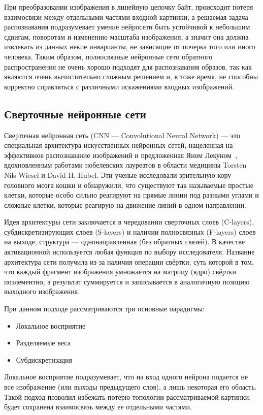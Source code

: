 \documentclass[a4paper,14pt]{extarticle} %
\begin{document}
При преобразовании изображения в линейную цепочку байт, происходит потеря взаимосвязи между отдельными частями входной картинки, а решаемая задача распознавания подразумевает умение нейросети быть устойчивой к небольшим сдвигам, поворотам и изменению масштаба изображения, а значит она должна извлекать из данных некие инварианты, не зависящие от почерка того или иного человека. Таким образом, полносвязные нейронные сети обратного распространения не очень хорошо подходят для распознавания образов, так как являются очень вычислительно сложным решением и, в тоже время, не способны корректно справляться с различными искажениями входных изображений.

\subsection{Сверточные нейронные сети}
\hspace{\parindent} Сверточная нейронная сеть (CNN --- Convolutional Neural Network) --- это специальная архитектура искусственных нейронных сетей, нацеленная на эффективное распознавание изображений и предложенная Яном Лекуном~\cite{lecuncomparison}, вдохновленным работами нобелевских лауреатов в области медицины Torsten Nils Wiesel и David H. Hubel. Эти ученые исследовали зрительную кору головного мозга кошки и обнаружили, что существуют так называемые простые клетки, которые особо сильно реагируют на прямые линии под разными углами и сложные клетки, которые реагирую на движение линий в одном направлении. 

Идея архитектуры сети заключается в чередовании сверточных слоев (C-layers), субдискретизирующих слоев (S-layers) и наличии полносвязных (F-layers) слоев на выходе, структура --- однонаправленная (без обратных связей). В качестве активационной используется любая функция по выбору исследователя. Название архитектура сети получила из-за наличия операции свёртки, суть которой в том, что каждый фрагмент изображения умножается на матрицу (ядро) свёртки поэлементно, а результат суммируется и записывается в аналогичную позицию выходного изображения.

При данном подходе рассматриваются три основные парадигмы:
\begin{itemize}
\item Локальное восприятие
\item Разделяемые веса
\item Субдискретизация
\end{itemize}

Локальное восприятие подразумевает, что на вход одного нейрона подается не все изображение (или выходы предыдущего слоя), а лишь некоторая его область. Такой подход позволил избежать потерю топологии рассматриваемой картинки, будет сохранена взаимосвязь между ее отдельными частями. 
\end{document}
